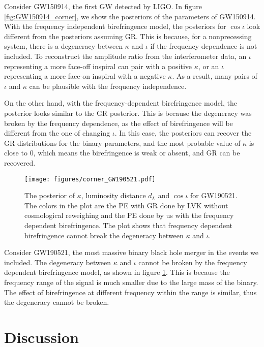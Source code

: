 \documentclass[reprint,amsmath,amssymb,aps,twocolumn]{aastex631}
\begin{document}
Consider GW150914, the first GW detected by LIGO.
In figure \ref{fig:GW150914_corner}, we show the posteriors of the parameters of GW150914.
With the frequency independent birefringence model, the posteriors for $\cos\iota$ look different from the posteriors assuming GR.
This is because, for a nonprecessing system, there is a degeneracy between $\kappa$ and $\iota$ if the frequency dependence is not included.
To reconstruct the amplitude ratio from the interferometer data, an $\iota$ representing a more face-off inspiral can pair with a positive $\kappa$, or an $\iota$ representing a more face-on inspiral with a negative $\kappa$.
As a result, many pairs of $\iota$ and $\kappa$ can be plausible with the frequency independence.

On the other hand, with the frequency-dependent birefringence model, the posterior looks similar to the GR posterior.
This is because the degeneracy was broken by the frequency dependence, as the effect of birefringence will be different from the one of changing $\iota$.
In this case, the posteriors can recover the GR distributions for the binary parameters,
and the most probable value of $\kappa$ is close to $0$, which means the birefringence is weak or absent, and GR can be recovered.


\begin{figure}[h]
    \texttt{[image: figures/corner\_GW190521.pdf]}
    \caption{
        The posterior of $\kappa$, luminosity distance $d_L$ and $\cos{\iota}$ for GW190521.
        The colors in the plot are the PE with GR done by LVK without cosmological reweighing \citep{GWTC-2.1, GWTC-3} and the PE done by us with the frequency dependent birefringence.
        The plot shows that frequency dependent birefringence cannot break the degeneracy between $\kappa$ and $\iota$.
    }
    \label{fig:corner_GW190521}
\end{figure}

Consider GW190521, the most massive binary black hole merger in the events we included.
The degeneracy between $\kappa$ and $\iota$ cannot be broken by the frequency dependent birefringence model, as shown in figure \ref{fig:corner_GW190521}.
This is because the frequency range of the signal is much smaller due to the large mass of the binary.
The effect of birefringence at different frequency within the range is similar, thus the degeneracy cannot be broken.

\section{Discussion}
\label{sec:Discussion}
\end{document}
